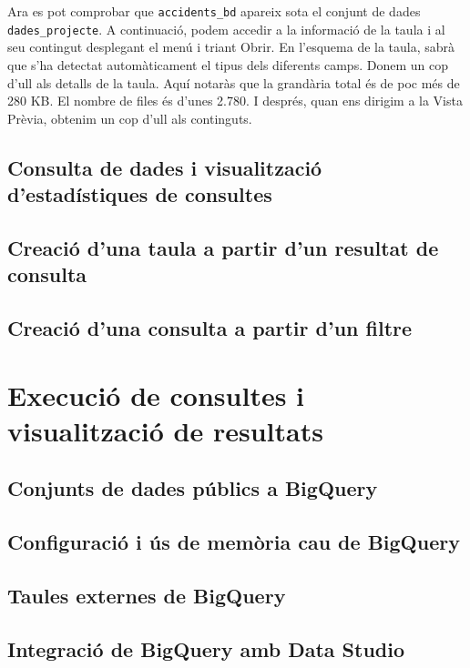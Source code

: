 \documentclass[12pt,longbibliography]{article}
\theoremstyle{definition}
\theoremstyle{remark}
\begin{document}
\vspace{2mm}

Ara es pot comprobar que \verb|accidents_bd| apareix sota el conjunt de dades \verb|dades_projecte|. A continuació, podem accedir a la informació de la taula i al seu contingut desplegant el menú i triant Obrir. En l'esquema de la taula, sabrà que s'ha detectat automàticament el tipus dels diferents camps. Donem un cop d'ull als detalls de la taula. Aquí notaràs que la grandària total és de poc més de 280 KB. El nombre de files és d'unes 2.780. I després, quan ens dirigim a la Vista Prèvia, obtenim un cop d'ull als continguts. 

\subsection{Consulta de dades i visualització d'estadístiques de consultes}

\subsection{Creació d'una taula a partir d'un resultat de consulta}

\subsection{Creació d'una consulta a partir d'un filtre}

\newpage

\section{Execució de consultes i visualització de resultats}

\subsection{Conjunts de dades públics a BigQuery}

\subsection{Configuració i ús de memòria cau de BigQuery}

\subsection{Taules externes de BigQuery}

\subsection{Integració de BigQuery amb Data Studio}

\newpage

\listoffigures
\end{document}
